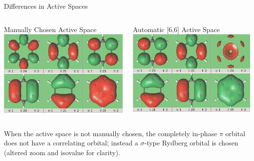\documentclass[12pt,aspectratio=169]{beamer}
\begin{document}
	\begin{frame}{Differences in Active Spaces}
		\begin{columns}
			\begin{column}{.5\linewidth}
				
				
				Manually Chosen Active Space
				\includegraphics[width=\linewidth]{manual.png}
			\end{column}
			\begin{column}{.5\linewidth}
				
				
				Automatic [6,6] Active Space
				\includegraphics[width=\linewidth]{automatic.png}
			\end{column}
		\end{columns}
		When the active space is not manually chosen, the completely in-phase $\pi$ orbital does not have a correlating orbital; instead a $\sigma$-type Rydberg orbital is chosen (altered zoom and isovalue for clarity).
	\end{frame}
\end{document}
